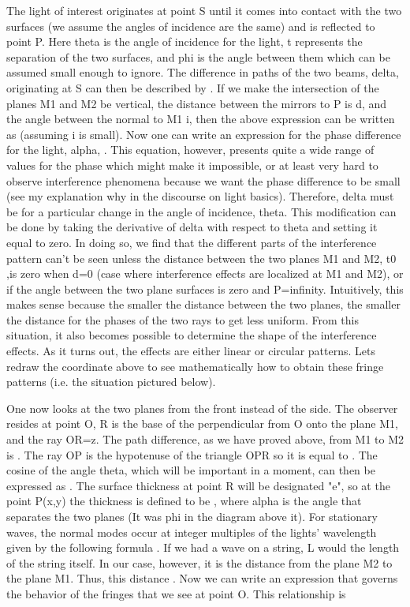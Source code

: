     The light of interest originates at point S until it comes into contact with the two surfaces (we assume the angles of incidence are the same) and is reflected to point P.  Here theta is the angle of incidence for the light, t represents the separation of the two surfaces, and phi is the angle between them which can be assumed small enough to ignore.  The difference in paths of the two beams, delta, originating at S can then be described by .  If we make the intersection of the planes M1 and M2 be vertical, the distance between the mirrors to P is d, and the angle between the normal to M1 i, then the above expression can be written as   (assuming i is small).  Now one can write an expression for the phase difference for the light, alpha,  .   This equation, however, presents quite a wide range of values for the phase which might make it impossible, or at least very hard to observe interference phenomena because we want the phase difference to be small (see my explanation why in the discourse on light basics).  Therefore,  delta must be for a particular change in the angle of incidence, theta.  This modification can be done by taking the derivative of delta with respect to theta and setting it equal to zero.   In doing so, we find that the different parts of the interference pattern can't be seen unless the distance between the two planes M1 and M2, t0 ,is zero when d=0 (case where interference effects are localized at M1 and M2),  or if the angle between the two plane surfaces is zero and P=infinity.  Intuitively, this makes sense because the smaller the distance between the two planes, the smaller the distance for the phases of the two rays to get less uniform.  From this situation, it also becomes possible to determine the shape of the interference effects.  As it turns out, the effects are either linear or circular patterns.  Lets redraw the coordinate above to see mathematically how to obtain these fringe patterns (i.e. the situation pictured below).

 

  One now looks at the two planes from the front instead of the side.  The observer resides at point O, R is the base of the perpendicular from O onto the plane M1, and the ray OR=z.  The path difference, as we have proved above, from M1 to M2 is .  The ray OP is the hypotenuse of the triangle OPR so it is equal to .  The cosine of the angle theta, which will be important in a moment, can then be expressed as .  The surface thickness at point R will be designated "e", so at the point P(x,y)   the thickness is defined to be , where alpha is the angle that separates the two planes (It was phi in the diagram above it).  For stationary waves, the normal modes occur at integer multiples of the lights' wavelength given by the following formula .  If we had a wave on a string, L would the length of the string itself.   In our case, however, it is the distance from the plane M2 to the plane M1.   Thus, this distance .  Now we can write an expression that governs the behavior of the fringes that we see at point O.  This relationship is

